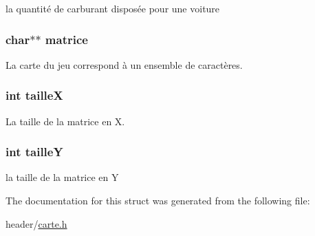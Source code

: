 la quantité de carburant disposée pour une voiture 

\hypertarget{struct_carte_a82035e42cf92072f1c0924addca5a624}{
\subsubsection[{matrice}]{\setlength{\rightskip}{0pt plus 5cm}char$\ast$$\ast$ matrice}}\label{struct_carte_a82035e42cf92072f1c0924addca5a624}


La carte du jeu correspond à un ensemble de caractères. 

\hypertarget{struct_carte_afdf3d36b301d88596fa665cd22ff06aa}{
\subsubsection[{taille\-X}]{\setlength{\rightskip}{0pt plus 5cm}int taille\-X}}\label{struct_carte_afdf3d36b301d88596fa665cd22ff06aa}


La taille de la matrice en X. 

\hypertarget{struct_carte_a24c31ab56ac04191ff18cbe37bb9b168}{
\subsubsection[{taille\-Y}]{\setlength{\rightskip}{0pt plus 5cm}int taille\-Y}}\label{struct_carte_a24c31ab56ac04191ff18cbe37bb9b168}


la taille de la matrice en Y 



The documentation for this struct was generated from the following file\-:\begin{DoxyCompactItemize}
\item 
header/\hyperlink{carte_8h}{carte.\-h}\end{DoxyCompactItemize}
